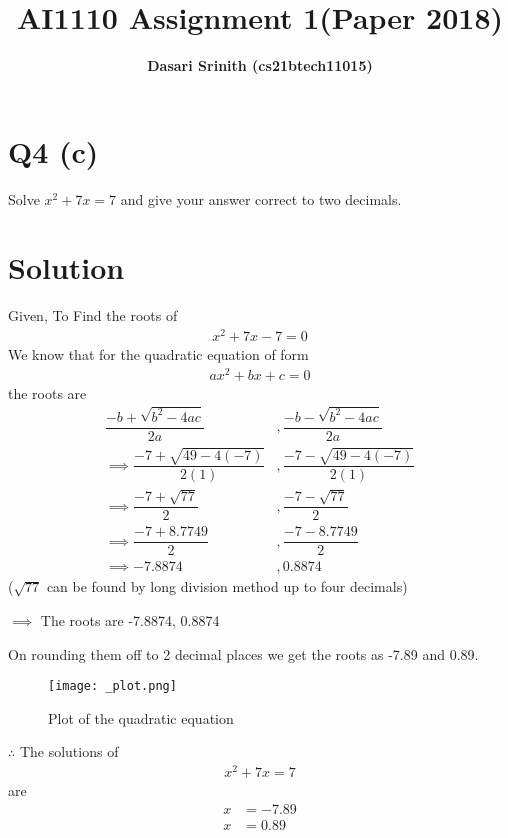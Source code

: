 \documentclass[12pt,letterpaper,twocolumn]{article}
\title{\textbf{AI1110 Assignment 1(Paper 2018)}}
\author{\textbf{Dasari Srinith (cs21btech11015)}}
\date{}
\begin{document}
\maketitle

\section*{Q4 (c)}
    Solve $x^2 + 7x = 7$ and give your answer correct to two decimals.
\vspace{-0.5cm}
\section*{Solution}

    Given,
    To Find the roots of
    \begin{align}
        x^2 +7x -7 = 0
    \end{align}
    We know that for the quadratic equation of form
    \begin{align}
        ax^2 + bx +c = 0
    \end{align}
    the roots are
    \begin{align}
        \dfrac{-b+\sqrt{b^2 -4ac}}{2a}&,\dfrac{-b-\sqrt{b^2 -4ac}}{2a}\\[10pt]
        \implies \dfrac{-7+\sqrt{49-4(-7)}}{2(1)}&,
        \dfrac{-7-\sqrt{49 -4(-7)}}{2(1)}\\[10pt]
        \implies \dfrac{-7+\sqrt{77}}{2}&,
        \dfrac{-7-\sqrt{77}}{2}\\[10pt]
        \implies \dfrac{-7+8.7749}{2} &,\dfrac{-7-8.7749}{2}\\[10pt]
        \implies -7.8874 &, 0.8874
    \end{align}
($\sqrt{77}$ can be found by long division method up to four decimals)
    
$\implies$ The roots are -7.8874, 0.8874
    
On rounding them off to 2 decimal places we get the roots as -7.89 and 0.89.
    
\begin{figure}[H]
    \centering
    \texttt{[image: \_plot.png]}
    \caption{Plot of the quadratic equation}
\end{figure}
 
$\therefore$ The solutions of 
\begin{align}
    x^2 + 7x = 7
\end{align}
are
\begin{align}
    x &= -7.89\\
    x &= 0.89
\end{align}
    
\end{document}
